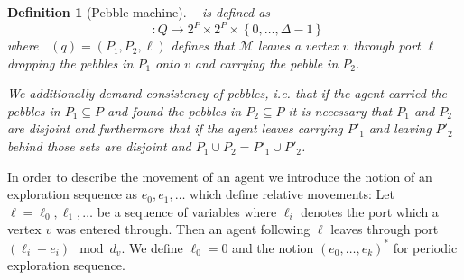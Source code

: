 \documentclass[oneside]{scrartcl}
\newtheorem{definition}{Definition}
\DeclareMathOperator{\dout}{\delta_{\mathit{out}}}
\begin{document}
\begin{definition}[Pebble machine]
  $\dout$ is defined as
  \begin{equation*}
    \dout\colon Q
    \rightarrow 2^{P}\times 2^{P}\times \left\{0,\dots,\Delta - 1\right\}
  \end{equation*}
  where $\dout(q) = (P_{1}, P_{2}, \ell)$ defines that $\mathcal{M}$ leaves
  a vertex $v$ through port $\ell$ dropping the pebbles in $P_{1}$ onto $v$
  and carrying the pebble in $P_{2}$.

  We additionally demand consistency of pebbles, i.e. that if the agent
  carried the pebbles in $P_{1}\subseteq P$ and found the pebbles in
  $P_{2}\subseteq P$ it is necessary that $P_{1}$ and $P_{2}$ are disjoint and
  furthermore that if the agent leaves carrying $P'_{1}$ and leaving $P'_{2}$
  behind those sets are disjoint and $P_{1}\cup P_{2} = P'_{1}\cup P'_{2}$.
\end{definition}

In order to describe the movement of an agent we introduce the notion of an
exploration sequence as $e_{0}, e_{1},\dots$ which define relative movements:
Let $\ell = \ell_{0},\ell_{1},\dots$ be a sequence of variables where
$\ell_{i}$ denotes the port which a vertex $v$ was entered through. Then an
agent following $\ell$ leaves through port
$(\ell_{i} + e_{i}) \mod d_{v}$. We define $\ell_{0} = 0$ and the notion
$(e_{0},\dots,e_{k})^{\ast}$ for periodic exploration sequence.
\end{document}
